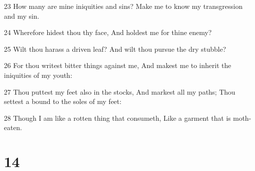 \par 23 How many are mine iniquities and sins? Make me to know my transgression and my sin.
\par 24 Wherefore hidest thou thy face, And holdest me for thine enemy?
\par 25 Wilt thou harass a driven leaf? And wilt thou pursue the dry stubble?
\par 26 For thou writest bitter things against me, And makest me to inherit the iniquities of my youth:
\par 27 Thou puttest my feet also in the stocks, And markest all my paths; Thou settest a bound to the soles of my feet:
\par 28 Though I am like a rotten thing that consumeth, Like a garment that is moth-eaten.

\chapter{14}

